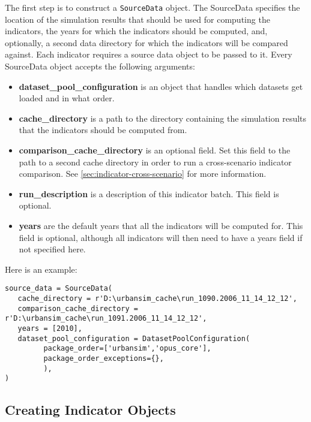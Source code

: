 The first step is to construct a \verb|SourceData| object.
The SourceData specifies 
the location of the simulation results that should be 
used for computing the indicators, the years for which the indicators should be
computed, and, optionally, a second data directory for which the indicators will
be compared against. Each indicator requires a source data object to be passed
to it. Every SourceData object accepts the following arguments:
\begin{itemize}
\tight
\item {\bf dataset_pool_configuration} is an object that handles which 
datasets get loaded and in what order. 

\item {\bf cache_directory} is a path to the directory containing the 
simulation results that the indicators should be computed from.

\item {\bf comparison_cache_directory} is an optional field. Set this field 
to the path to a second cache directory in order to run a 
cross-scenario indicator comparison. See \ref{sec:indicator-cross-scenario}
for more information.

\item {\bf run_description} is a description of this indicator batch. 
This field is optional. 

\item {\bf years} are the default years that all the indicators will be computed for.
This field is optional, although all indicators will then need to have a 
years field if not specified here.

\end{itemize}

Here is an example:

\begin{verbatim}
source_data = SourceData(
   cache_directory = r'D:\urbansim_cache\run_1090.2006_11_14_12_12',
   comparison_cache_directory = r'D:\urbansim_cache\run_1091.2006_11_14_12_12',
   years = [2010],
   dataset_pool_configuration = DatasetPoolConfiguration(
         package_order=['urbansim','opus_core'],
         package_order_exceptions={},
         ),                  
)
\end{verbatim}

\subsection{Creating Indicator Objects}

